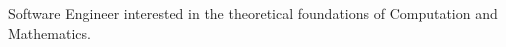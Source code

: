 
    \begin{cvparagraph}
        Software Engineer interested in the theoretical foundations of Computation and Mathematics.
    \end{cvparagraph}